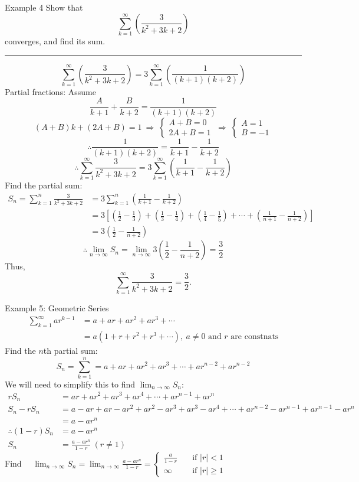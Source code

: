 \documentclass[12pt,a4paper]{article}
\begin{document}
\begin{eg}{Example 4}
	Show that $$\sum^\infty_{k=1}\left(\frac{3}{k^2+3k+2}\right)$$ converges, and find its sum. \\
	\noindent\rule[0.25\baselineskip]{\textwidth}{1pt}
	$$\sum^\infty_{k=1}\left(\frac{3}{k^2+3k+2}\right)=3\sum^\infty_{k=1}\left(\frac{1}{(k+1)(k+2)}\right)$$
	Partial fractions: Assume $$\frac{A}{k+1}+\frac{B}{k+2}=\frac{1}{(k+1)(k+2)}$$
	$$(A+B)k+(2A+B)=1\ \Rightarrow\ \begin{cases}A+B=0\\2A+B=1\end{cases}\ \Rightarrow\ \begin{cases}A=1\\B=-1\end{cases}$$
	$$\therefore\frac{1}{(k+1)(k+2)}=\frac{1}{k+1}-\frac{1}{k+2}$$
	$$\therefore\sum^\infty_{k=1}\frac{3}{k^2+3k+2}=3\sum^\infty_{k=1}\left(\frac{1}{k+1}-\frac{1}{k+2}\right)$$
	Find the partial sum: 
	$$\begin{aligned}
		S_n=\sum^n_{k=1}\frac{3}{k^2+3k+2}&=3\sum^n_{k=1}\left(\frac{1}{k+1}-\frac{1}{k+2}\right)\\
		&=3\left[(\frac{1}{2}-\frac{1}{3})+(\frac{1}{3}-\frac{1}{4})+(\frac{1}{4}-\frac{1}{5})+\cdots+(\frac{1}{n+1}-\frac{1}{n+2})\right]\\
		&=3\left(\frac{1}{2}-\frac{1}{n+2}\right)
	\end{aligned}$$
	$$\therefore\lim_{n\to\infty}S_n=\lim_{n\to\infty}3\left(\frac{1}{2}-\frac{1}{n+2}\right)=\frac{3}{2}$$
	Thus, $$\sum^\infty_{k=1}\frac{3}{k^2+3k+2}=\frac{3}{2}.$$
\end{eg}
\begin{eg}{Example 5: Geometric Series}
	$$\begin{aligned}
		\sum^\infty_{k=1}ar^{k-1}&=a+ar+ar^2+ar^3+\cdots\\
		&=a(1+r+r^2+r^3+\cdots),\ a\neq0\text{ and }r\text{ are constnats}
	\end{aligned}$$	
	Find the $n$th partial sum: 
	$$S_n=\sum^n_{k=1}=a+ar+ar^2+ar^3+\cdots+ar^{n-2}+ar^{n-2}$$
	We will need to simplify this to find $\displaystyle\lim_{n\to\infty}S_n$: 
	$$\begin{aligned}
		rS_n&=ar+ar^2+ar^3+ar^4+\cdots+ar^{n-1}+ar^n\\
		S_n-rS_n&=a-ar+ar-ar^2+ar^2-ar^3+ar^3-ar^4+\cdots+ar^{n-2}-ar^{n-1}+ar^{n-1}-ar^n\\
		&=a-ar^n\\
		\therefore (1-r)S_n&=a-ar^n\\
		S_n&=\frac{a-ar^n}{1-r}\ (r\neq1)
	\end{aligned}$$
	Find $\quad\displaystyle\lim_{n\to\infty}S_n=\lim_{n\to\infty}\frac{a-ar^n}{1-r}=\begin{cases}\frac{a}{1-r}&\quad\text{if }|r|<1\\\infty&\quad\text{if }|r|\geq1\end{cases}$
\end{eg}
\end{document}

